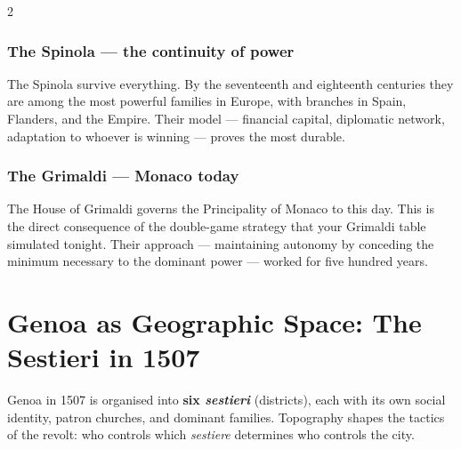 \begin{multicols}{2}
\subsubsection{The Spinola --- the continuity of power}

The Spinola survive everything. By the seventeenth and eighteenth centuries
they are among the most powerful families in Europe, with branches in Spain,
Flanders, and the Empire. Their model --- financial capital, diplomatic
network, adaptation to whoever is winning --- proves the most durable.

\subsubsection{The Grimaldi --- Monaco today}


The House of Grimaldi governs the Principality of Monaco to this day.
This is the direct consequence of the double-game strategy that your
Grimaldi table simulated tonight. Their approach --- maintaining autonomy
by conceding the minimum necessary to the dominant power --- worked for
five hundred years.

\end{multicols}

\section{Genoa as Geographic Space: The Sestieri in 1507}
\label{sec:geography}


Genoa in 1507 is organised into \textbf{six \textit{sestieri}} (districts),
each with its own social identity, patron churches, and dominant families.
Topography shapes the tactics of the revolt: who controls which
\textit{sestiere} determines who controls the city.

